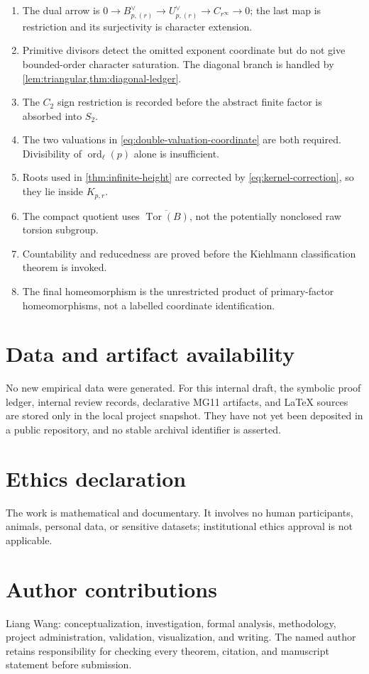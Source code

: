 \documentclass[11pt]{article}
\theoremstyle{definition}
\DeclareMathOperator{\Tor}{Tor}
\DeclareMathOperator{\ord}{ord}
\begin{document}
\begin{enumerate}
\item The dual arrow is
$0\to B_{p,(r)}^\vee\to U_{p,(r)}^\vee\to C_{r^\infty}\to0$;
the last map is restriction and its surjectivity is character extension.
\item Primitive divisors detect the omitted exponent coordinate but do not
give bounded-order character saturation.  The diagonal branch is handled by
\cref{lem:triangular,thm:diagonal-ledger}.
\item The $C_2$ sign restriction is recorded before the abstract finite factor
is absorbed into $S_2$.
\item The two valuations in \eqref{eq:double-valuation-coordinate} are both
required.  Divisibility of $\ord_\ell(p)$ alone is insufficient.
\item Roots used in \cref{thm:infinite-height} are corrected by
\eqref{eq:kernel-correction}, so they lie inside $K_{p,r}$.
\item The compact quotient uses $\overline{\Tor(B)}$, not the potentially
nonclosed raw torsion subgroup.
\item Countability and reducedness are proved before the Kiehlmann
classification theorem is invoked.
\item The final homeomorphism is the unrestricted product of primary-factor
homeomorphisms, not a labelled coordinate identification.
\end{enumerate}

\section*{Data and artifact availability}
No new empirical data were generated.  For this internal draft, the symbolic
proof ledger, internal review records, declarative MG11 artifacts, and LaTeX
sources are stored only in the local project snapshot.  They have not yet been
deposited in a public repository, and no stable archival identifier is asserted.

\section*{Ethics declaration}
The work is mathematical and documentary.  It involves no human participants,
animals, personal data, or sensitive datasets; institutional ethics approval
is not applicable.

\section*{Author contributions}
Liang Wang: conceptualization, investigation, formal analysis, methodology,
project administration, validation, visualization, and writing.  The named
author retains responsibility for checking every theorem, citation, and
manuscript statement before submission.
\end{document}

